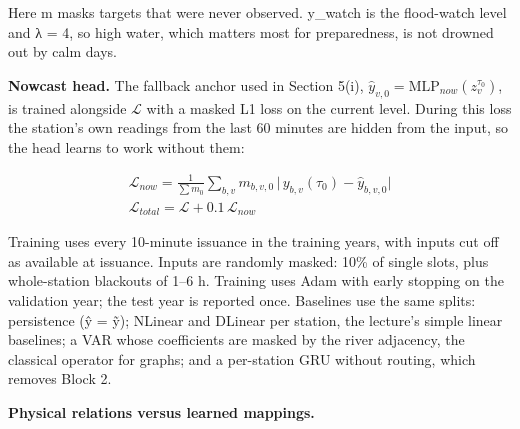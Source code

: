 \documentclass[11pt]{article}
\begin{document}
Here m masks targets that were never observed. y\_watch is the flood-watch level and λ = 4, so high water, which matters most for preparedness, is not drowned out by calm days.

\textbf{Nowcast head.} The fallback anchor used in Section 5(i), \(\hat y_{v,0} = \mathrm{MLP}_{now}(z_v^{\tau_0})\), is trained alongside \(\mathcal{L}\) with a masked L1 loss on the current level. During this loss the station's own readings from the last 60 minutes are hidden from the input, so the head learns to work without them:

\[
\begin{gathered}
\mathcal{L}_{now} = \frac{1}{\sum m_0}\sum_{b,v} m_{b,v,0}\,\big|\,y_{b,v}(\tau_0) - \hat y_{b,v,0}\big| \\ \mathcal{L}_{total} = \mathcal{L} + 0.1\,\mathcal{L}_{now}
\end{gathered}
\]

Training uses every 10-minute issuance in the training years, with inputs cut off as available at issuance. Inputs are randomly masked: 10\% of single slots, plus whole-station blackouts of 1--6 h. Training uses Adam with early stopping on the validation year; the test year is reported once. Baselines use the same splits: persistence (ŷ = ỹ); NLinear and DLinear per station, the lecture's simple linear baselines; a VAR whose coefficients are masked by the river adjacency, the classical operator for graphs; and a per-station GRU without routing, which removes Block 2.

\textbf{Physical relations versus learned mappings.}
\end{document}
